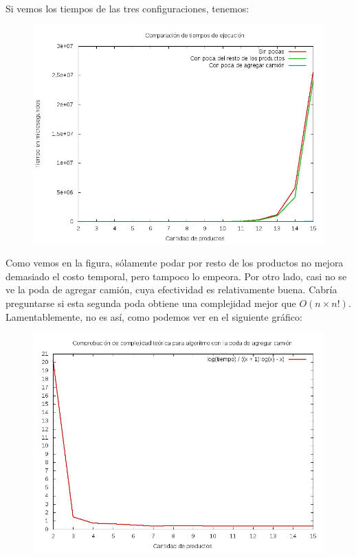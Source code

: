 Si vemos los tiempos de las tres configuraciones, tenemos:
\begin{figure}[H]
	\begin{minipage}[t]{\linewidth}
		\centering
		\includegraphics[width=\textwidth]{comparacion_tiempos_podas.jpg}
		\label{fig:p3_comparacion_3_configuraciones}
	\end{minipage}
\end{figure}

Como vemos en la figura, sólamente podar por resto de los productos no mejora demasiado el costo temporal, pero tampoco lo empeora. Por otro lado, casi no se ve la poda de agregar camión, cuya efectividad es relativamente buena. Cabría preguntarse si esta segunda poda obtiene una complejidad mejor que $O(n \times n!)$. Lamentablemente, no es así, como podemos ver en el siguiente gráfico:

\begin{figure}[H]
	\begin{minipage}[t]{\linewidth}
		\centering
		\includegraphics[width=\textwidth]{complejidad_con_poda_camion.jpg}
		\label{fig:p3_complejidad_con_poda_camion}
	\end{minipage}
\end{figure}


